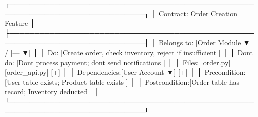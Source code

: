 \documentclass[
]{article}
\newenvironment{Shaded}{}{}
\newcommand{\NormalTok}[1]{#1}
\begin{document}
\begin{Shaded}
\begin{Highlighting}[]
\NormalTok{┌─────────────────────────────────────────────────────────────────────────────┐}
\NormalTok{│ Contract: Order Creation Feature                                             │}
\NormalTok{├─────────────────────────────────────────────────────────────────────────────┤}
\NormalTok{│ Belongs to:  [Order Module ▼] / [— ▼]                                       │}
\NormalTok{│ Do:          [Create order, check inventory, reject if insufficient    ]    │}
\NormalTok{│ Don\textquotesingle{}t do:    [Don\textquotesingle{}t process payment; don\textquotesingle{}t send notifications          ]    │}
\NormalTok{│ Files:       [order.py] [order\_api.py] [+]                                  │}
\NormalTok{│ Dependencies:[User Account ▼] [+]                                           │}
\NormalTok{│ Precondition:[User table exists; Product table exists                  ]    │}
\NormalTok{│ Postcondition:[Order table has record; Inventory deducted              ]    │}
\NormalTok{└─────────────────────────────────────────────────────────────────────────────┘}


\end{Highlighting}
\end{Shaded}
\end{document}
